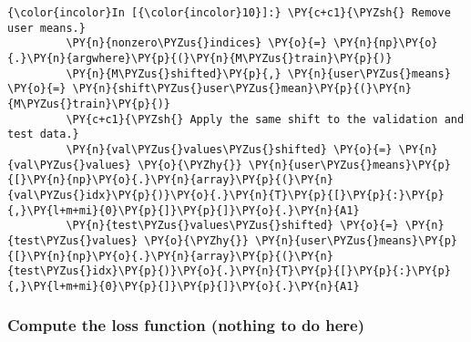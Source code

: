     \begin{Verbatim}[commandchars=\\\{\}]
{\color{incolor}In [{\color{incolor}10}]:} \PY{c+c1}{\PYZsh{} Remove user means.}
         \PY{n}{nonzero\PYZus{}indices} \PY{o}{=} \PY{n}{np}\PY{o}{.}\PY{n}{argwhere}\PY{p}{(}\PY{n}{M\PYZus{}train}\PY{p}{)}
         \PY{n}{M\PYZus{}shifted}\PY{p}{,} \PY{n}{user\PYZus{}means} \PY{o}{=} \PY{n}{shift\PYZus{}user\PYZus{}mean}\PY{p}{(}\PY{n}{M\PYZus{}train}\PY{p}{)}
         \PY{c+c1}{\PYZsh{} Apply the same shift to the validation and test data.}
         \PY{n}{val\PYZus{}values\PYZus{}shifted} \PY{o}{=} \PY{n}{val\PYZus{}values} \PY{o}{\PYZhy{}} \PY{n}{user\PYZus{}means}\PY{p}{[}\PY{n}{np}\PY{o}{.}\PY{n}{array}\PY{p}{(}\PY{n}{val\PYZus{}idx}\PY{p}{)}\PY{o}{.}\PY{n}{T}\PY{p}{[}\PY{p}{:}\PY{p}{,}\PY{l+m+mi}{0}\PY{p}{]}\PY{p}{]}\PY{o}{.}\PY{n}{A1}
         \PY{n}{test\PYZus{}values\PYZus{}shifted} \PY{o}{=} \PY{n}{test\PYZus{}values} \PY{o}{\PYZhy{}} \PY{n}{user\PYZus{}means}\PY{p}{[}\PY{n}{np}\PY{o}{.}\PY{n}{array}\PY{p}{(}\PY{n}{test\PYZus{}idx}\PY{p}{)}\PY{o}{.}\PY{n}{T}\PY{p}{[}\PY{p}{:}\PY{p}{,}\PY{l+m+mi}{0}\PY{p}{]}\PY{p}{]}\PY{o}{.}\PY{n}{A1}
\end{Verbatim}

    \hypertarget{compute-the-loss-function-nothing-to-do-here}{%
\subsubsection{Compute the loss function (nothing to do
here)}\label{compute-the-loss-function-nothing-to-do-here}}

